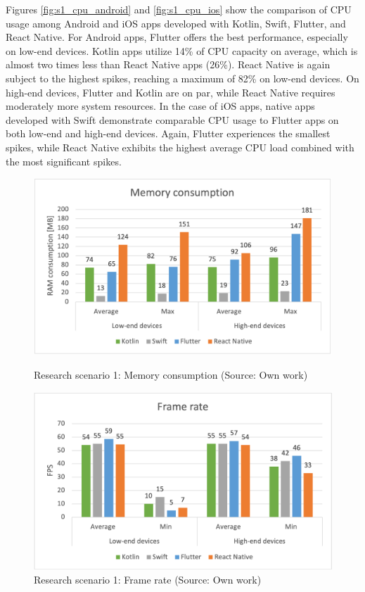 Figures \ref{fig:s1_cpu_android} and \ref{fig:s1_cpu_ios} show the comparison of CPU usage among Android and iOS apps developed with Kotlin, Swift, Flutter, and React Native. For Android apps, Flutter offers the best performance, especially on low-end devices. Kotlin apps utilize 14\% of CPU capacity on average, which is almost two times less than React Native apps (26\%). React Native is again subject to the highest spikes, reaching a maximum of 82\% on low-end devices. On high-end devices, Flutter and Kotlin are on par, while React Native requires moderately more system resources. In the case of iOS apps, native apps developed with Swift demonstrate comparable CPU usage to Flutter apps on both low-end and high-end devices. Again, Flutter experiences the smallest spikes, while React Native exhibits the highest average CPU load combined with the most significant spikes.

\begin{figure}[H]
    \begin{minipage}{.48\textwidth}
        \includegraphics[width=\textwidth]{img/scenario1_ram}
    \caption{Research scenario 1: Memory consumption (Source: Own work)}
    \label{fig:s1_ram}
    \end{minipage}
    \hfill
    \begin{minipage}{.48\textwidth}
        \includegraphics[width=\textwidth]{img/scenario1_fps}
    \caption{Research scenario 1: Frame rate (Source: Own work)}
    \label{fig:s1_fps}
    \end{minipage}
\end{figure}

